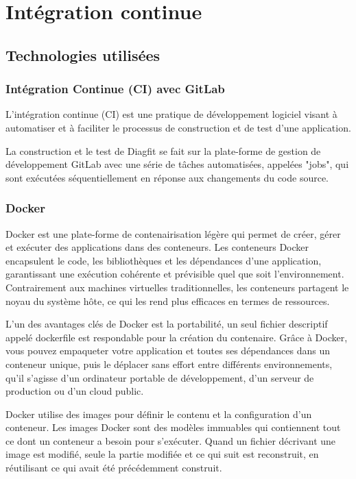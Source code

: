 \section{Intégration continue}
\subsection{Technologies utilisées}
\subsubsection{Intégration Continue (CI) avec GitLab}
L'intégration continue (CI) est une pratique de développement logiciel visant à automatiser et à faciliter le processus de construction et de test d'une application.

La construction et le test de Diagfit se fait sur la plate-forme de gestion de développement GitLab avec une série de tâches automatisées, appelées "jobs", qui sont exécutées séquentiellement en réponse aux changements du code source.

\subsubsection{Docker}
Docker est une plate-forme de contenairisation légère qui permet de créer, gérer et exécuter des applications dans des conteneurs.
Les conteneurs Docker encapsulent le code, les bibliothèques et les dépendances d'une application, garantissant une exécution cohérente et prévisible quel que soit l'environnement.
Contrairement aux machines virtuelles traditionnelles, les conteneurs partagent le noyau du système hôte, ce qui les rend plus efficaces en termes de ressources.

L'un des avantages clés de Docker est la portabilité, un seul fichier descriptif appelé dockerfile est respondable pour la création du contenaire.
Grâce à Docker, vous pouvez empaqueter votre application et toutes ses dépendances dans un conteneur unique, puis le déplacer sans effort entre différents environnements, qu'il s'agisse d'un ordinateur portable de développement, d'un serveur de production ou d'un cloud public.

Docker utilise des images pour définir le contenu et la configuration d'un conteneur.
Les images Docker sont des modèles immuables qui contiennent tout ce dont un conteneur a besoin pour s'exécuter.
Quand un fichier décrivant une image est modifié, seule la partie modifiée et ce qui suit est reconstruit, en réutilisant ce qui avait été précédemment construit.

